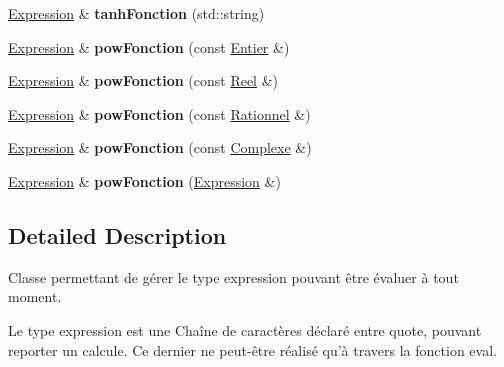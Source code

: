 \begin{DoxyCompactItemize}
\item 
\hypertarget{class_expression_a92f8d74008d1cb0d44bd705463a7416a}{\hyperlink{class_expression}{Expression} \& {\bfseries tanh\-Fonction} (std\-::string)}\label{class_expression_a92f8d74008d1cb0d44bd705463a7416a}

\item 
\hypertarget{class_expression_affde75e11b8700af3abcd47007a508fa}{\hyperlink{class_expression}{Expression} \& {\bfseries pow\-Fonction} (const \hyperlink{class_entier}{Entier} \&)}\label{class_expression_affde75e11b8700af3abcd47007a508fa}

\item 
\hypertarget{class_expression_a2fb3923dfcc37b04343ceb1007d24d6b}{\hyperlink{class_expression}{Expression} \& {\bfseries pow\-Fonction} (const \hyperlink{class_reel}{Reel} \&)}\label{class_expression_a2fb3923dfcc37b04343ceb1007d24d6b}

\item 
\hypertarget{class_expression_a0e76639cff34bad17689d4a5107dc176}{\hyperlink{class_expression}{Expression} \& {\bfseries pow\-Fonction} (const \hyperlink{class_rationnel}{Rationnel} \&)}\label{class_expression_a0e76639cff34bad17689d4a5107dc176}

\item 
\hypertarget{class_expression_a48839cd4843fe09e95c2dc4dff18106e}{\hyperlink{class_expression}{Expression} \& {\bfseries pow\-Fonction} (const \hyperlink{class_complexe}{Complexe} \&)}\label{class_expression_a48839cd4843fe09e95c2dc4dff18106e}

\item 
\hypertarget{class_expression_aea48c6f6091bf8b2b99a1845419bc0dc}{\hyperlink{class_expression}{Expression} \& {\bfseries pow\-Fonction} (\hyperlink{class_expression}{Expression} \&)}\label{class_expression_aea48c6f6091bf8b2b99a1845419bc0dc}

\end{DoxyCompactItemize}


\subsection{Detailed Description}
Classe permettant de gérer le type expression pouvant être évaluer à tout moment. 

Le type expression est une Chaîne de caractères déclaré entre quote, pouvant reporter un calcule. Ce dernier ne peut-\/être réalisé qu'à travers la fonction eval. 

